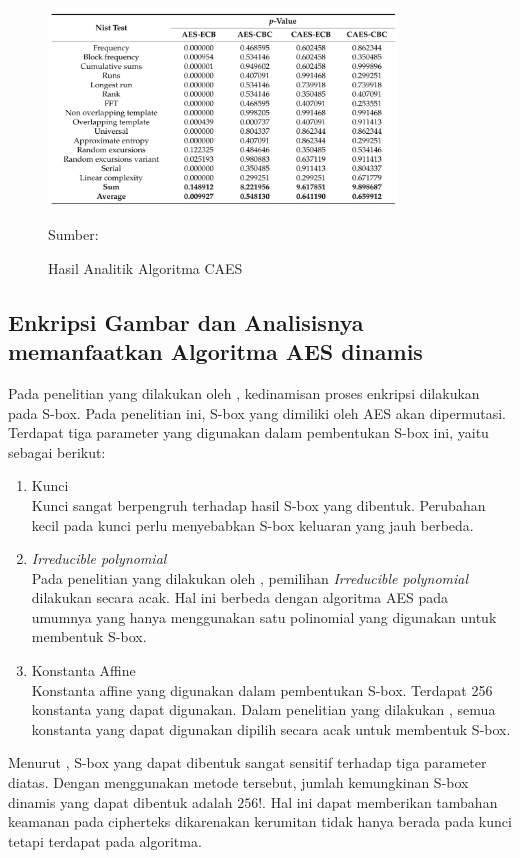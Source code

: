 \begin{figure}[!h]
  \centering
  \includegraphics[width=350px]{chapters/res/chapter-2/img/lin.analytic-test.png}
  \caption{Hasil Analitik Algoritma CAES} \label{fig:lin.analytic-result}
  Sumber: \textcite{lin2021}
\end{figure}

\subsection{Enkripsi Gambar dan Analisisnya memanfaatkan Algoritma AES dinamis}

Pada penelitian yang dilakukan oleh \textcite{singh2019}, kedinamisan proses enkripsi dilakukan pada S-box. Pada penelitian ini, S-box yang dimiliki oleh AES akan dipermutasi. Terdapat tiga parameter yang digunakan dalam pembentukan S-box ini, yaitu sebagai berikut:
\begin{enumerate}
  \item Kunci\\ Kunci sangat berpengruh terhadap hasil S-box yang dibentuk. Perubahan kecil pada kunci perlu menyebabkan S-box keluaran yang jauh berbeda.
  \item \emph{Irreducible polynomial}\\ Pada penelitian yang dilakukan oleh \textcite{singh2019}, pemilihan \emph{Irreducible polynomial} dilakukan secara acak. Hal ini berbeda dengan algoritma AES pada umumnya yang hanya menggunakan satu polinomial yang digunakan untuk membentuk S-box.
  \item Konstanta Affine\\ Konstanta affine yang digunakan dalam pembentukan S-box. Terdapat 256 konstanta yang dapat digunakan. Dalam penelitian yang dilakukan \textcite{singh2019}, semua konstanta yang dapat digunakan dipilih secara acak untuk membentuk S-box.
\end{enumerate}

Menurut \textcite{singh2019}, S-box yang dapat dibentuk sangat sensitif terhadap tiga parameter diatas. Dengan menggunakan metode tersebut, jumlah kemungkinan S-box dinamis yang dapat dibentuk adalah $256!$. Hal ini dapat memberikan tambahan keamanan pada cipherteks dikarenakan kerumitan tidak hanya berada pada kunci tetapi terdapat pada algoritma.

